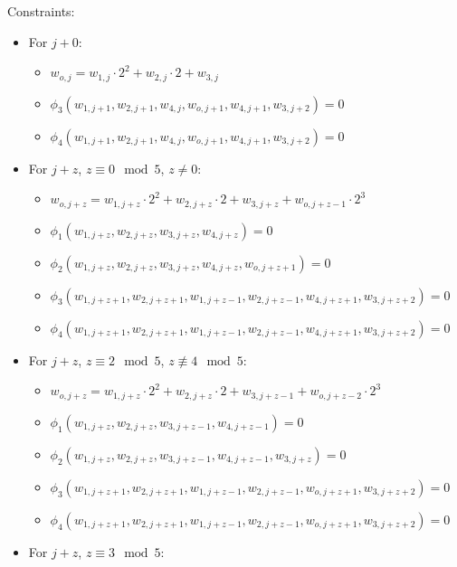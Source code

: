 Constraints:
\begin{itemize}
	\item For $j + 0$:
	\begin{itemize}
		\item $w_{o, j} = w_{1, j} \cdot 2^2 + w_{2, j} \cdot 2 + w_{3, j}$ 
		\item $\phi_3(w_{1, j + 1}, w_{2, j + 1}, w_{4, j}, w_{o, j + 1}, w_{4, j + 1}, w_{3, j + 2}) = 0$
		\item $\phi_4(w_{1, j + 1}, w_{2, j + 1}, w_{4, j}, w_{o, j + 1}, w_{4, j + 1}, w_{3, j + 2}) = 0$
	\end{itemize}
	\item For $j + z$, $z \equiv 0 \mod 5$, $z \neq 0$:
	\begin{itemize}
		\item $w_{o, j + z} = w_{1, j + z} \cdot 2^2 + w_{2, j + z} \cdot 2 + w_{3, j + z} + w_{o, j + z - 1} \cdot 2^3$ 
		\item $\phi_1(w_{1, j + z}, w_{2, j + z}, w_{3, j + z}, w_{4, j + z}) = 0$
		\item $\phi_2(w_{1, j + z}, w_{2, j + z}, w_{3, j + z}, w_{4, j + z}, w_{o, j + z + 1}) = 0$
		\item $\phi_3(w_{1, j + z + 1}, w_{2, j + z + 1}, w_{1, j + z - 1}, w_{2, j + z - 1}, w_{4, j + z + 1}, w_{3, j + z + 2}) = 0$
		\item $\phi_4(w_{1, j + z + 1}, w_{2, j + z + 1}, w_{1, j + z - 1}, w_{2, j + z - 1}, w_{4, j + z + 1}, w_{3, j + z + 2}) = 0$
	\end{itemize}
	\item For $j + z$, $z \equiv 2 \mod 5$, $z \not\equiv 4 \mod 5$:
	\begin{itemize}
		\item $w_{o, j + z} = w_{1, j + z} \cdot 2^2 + w_{2,j + z} \cdot 2 + w_{3, j + z - 1} + w_{o, j+ z - 2} \cdot 2^3$
		\item $\phi_1(w_{1, j + z}, w_{2, j + z}, w_{3, j + z - 1}, w_{4, j + z - 1}) = 0$
		\item $\phi_2(w_{1, j + z}, w_{2, j + z}, w_{3, j + z - 1}, w_{4, j + z - 1}, w_{3, j + z}) = 0$
		\item $\phi_3(w_{1, j + z + 1}, w_{2, j + z + 1}, w_{1, j + z - 1}, w_{2, j + z - 1}, w_{o, j + z + 1}, w_{3, j + z + 2}) = 0$
		\item $\phi_4(w_{1, j + z + 1}, w_{2, j + z + 1}, w_{1, j + z - 1}, w_{2, j + z - 1}, w_{o, j + z + 1}, w_{3, j + z + 2}) = 0$
	\end{itemize}
	\item For $j + z$, $z \equiv 3 \mod 5$:

\end{itemize}
